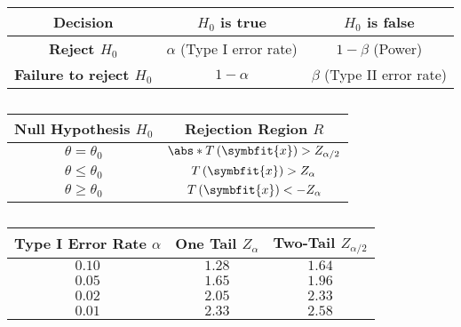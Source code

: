 \documentclass{article}
\begin{document}
\begin{table}[H]
    \centering
    \begin{tabular}{c|cc}
        \toprule
        \textbf{Decision}                  & \textbf{\(H_0\) is true}       & \textbf{\(H_0\) is false}      \\
        \midrule
        \textbf{Reject \(H_0\)}            & \(\alpha\) (Type I error rate) & \(1 - \beta\) (Power)          \\
        \textbf{Failure to reject \(H_0\)} & \(1 - \alpha\)                 & \(\beta\) (Type II error rate) \\
        \bottomrule
    \end{tabular}
    \caption{} %
\end{table}
\begin{table}[H]
    \centering
    \begin{tabular}{cc}
        \toprule
        \textbf{Null Hypothesis} \(H_0\) & \textbf{Rejection Region} \(R\)                       \\
        \midrule
        \(\theta = \theta_0\)            & \(\abs*{T\left( \symbfit{x} \right)} > Z_{\alpha/2}\) \\
        \(\theta \leq \theta_0\)         & \(T\left( \symbfit{x} \right) > Z_{\alpha}\)          \\
        \(\theta \geq \theta_0\)         & \(T\left( \symbfit{x} \right) < -Z_{\alpha}\)         \\
        \bottomrule
    \end{tabular}
    \caption{} %
\end{table}
\begin{table}[H]
    \centering
    \begin{tabular}{ccc}
        \toprule
        \textbf{Type I Error Rate} \(\alpha\) & \textbf{One Tail} \(Z_{\alpha}\) & \textbf{Two-Tail} \(Z_{\alpha/2}\) \\
        \midrule
        \(0.10\)                              & \(1.28\)                         & \(1.64\)                           \\
        \(0.05\)                              & \(1.65\)                         & \(1.96\)                           \\
        \(0.02\)                              & \(2.05\)                         & \(2.33\)                           \\
        \(0.01\)                              & \(2.33\)                         & \(2.58\)                           \\
        \bottomrule
    \end{tabular}
    \caption{} %
\end{table}
\end{document}
